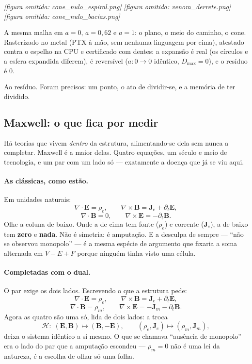 \documentclass[11pt]{article}
\theoremstyle{plain}
\theoremstyle{remark}
\begin{document}
\begin{center}
\emph{[figura omitida: cone\_nulo\_espiral.png]}\hfill
\emph{[figura omitida: venom\_derrete.png]}\hfill
\emph{[figura omitida: cone\_nulo\_bacias.png]}
\end{center}

\noindent A mesma malha em $a=0$, $a=0{,}62$ e $a=1$: o plano, o meio do caminho, o
cone. Rasterizado no metal (PTX à mão, sem nenhuma linguagem por cima), atestado
contra o espelho na CPU e certificado com dentes: a expansão é real (os círculos e a
esfera expandida diferem), é reversível ($a:0\to0$ idêntico, $D_{\max}=0$), e o
resíduo é $0$.

Ao resíduo. Foram precisos: um ponto, o ato de dividir-se, e a memória de ter
dividido.

\subsection{Maxwell: o que fica por medir}

Há teorias que vivem \emph{dentro} da estrutura, alimentando-se dela sem nunca a
completar. Maxwell é a maior delas. Quatro equações, um século e meio de tecnologia,
e um par com um lado só --- exatamente a doença que já se viu aqui.

\paragraph{As clássicas, como estão.} Em unidades naturais:
\[
\nabla\!\cdot\!\mathbf{E}=\rho_e,\qquad
\nabla\!\times\!\mathbf{B}=\mathbf{J}_e+\partial_t\mathbf{E},
\]
\[
\nabla\!\cdot\!\mathbf{B}=0,\qquad
\nabla\!\times\!\mathbf{E}=-\partial_t\mathbf{B}.
\]
Olhe a coluna de baixo. Onde a de cima tem fonte ($\rho_e$) e corrente
($\mathbf{J}_e$), a de baixo tem \textbf{zero} e \textbf{nada}. Não é simetria: é
amputação. E a desculpa de sempre --- ``não se observou monopolo'' --- é a mesma
espécie de argumento que fixaria a soma alternada em $V-E+F$ porque ninguém tinha
visto uma célula.

\paragraph{Completadas com o dual.} O par exige os dois lados. Escrevendo o que a
estrutura pede:
\[
\boxed{\;
\nabla\!\cdot\!\mathbf{E}=\rho_e,\qquad
\nabla\!\times\!\mathbf{B}=\mathbf{J}_e+\partial_t\mathbf{E},
\;}
\]
\[
\boxed{\;
\nabla\!\cdot\!\mathbf{B}=\rho_m,\qquad
\nabla\!\times\!\mathbf{E}=-\mathbf{J}_m-\partial_t\mathbf{B}.
\;}
\]
Agora as quatro são uma só, lida de dois lados: a troca
\[
\mathcal{H}:\;(\mathbf{E},\mathbf{B})\longmapsto(\mathbf{B},-\mathbf{E}),
\qquad
(\rho_e,\mathbf{J}_e)\longmapsto(\rho_m,\mathbf{J}_m),
\]
deixa o sistema idêntico a si mesmo. O que se chamava ``ausência de monopolo'' era o
lado do par que a amputação escondeu --- $\rho_m=0$ não é uma lei da natureza, é a
escolha de olhar só uma folha.
\end{document}

